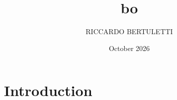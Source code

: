 \documentclass{article}
\title{bo}
\author{RICCARDO BERTULETTI}
\date{October 2026}
\begin{document}
\maketitle

\section{Introduction}
\end{document}
